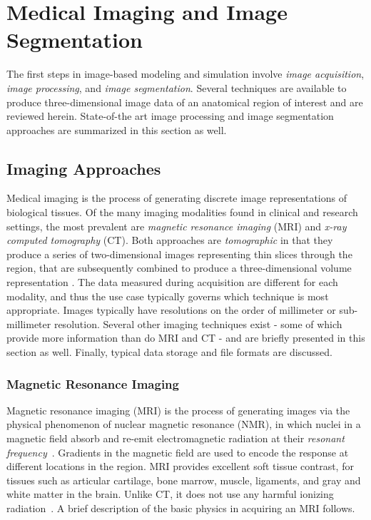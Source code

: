 \chapter{Medical Imaging and Image Segmentation}
%

The first steps in image-based modeling and simulation involve \textit{image acquisition}, \textit{image processing}, and \textit{image segmentation}. Several techniques are available to produce three-dimensional image data of an anatomical region of interest and are reviewed herein. State-of-the art image processing and image segmentation approaches are summarized in this section as well.

\section{Imaging Approaches}
\label{Imaging Approaches}

Medical imaging is the process of generating discrete image representations of biological tissues. Of the many imaging modalities found in clinical and research settings, the most prevalent are \textit{magnetic resonance imaging} (MRI) and \textit{x-ray computed tomography} (CT). Both approaches are \textit{tomographic} in that they produce a series of two-dimensional images representing thin slices through the region, that are subsequently combined to produce a three-dimensional volume representation \cite{larobina_murino_2014}. The data measured during acquisition are different for each modality, and thus the use case typically governs which technique is most appropriate. Images typically have resolutions on the order of millimeter or sub-millimeter resolution. Several other imaging techniques exist - some of which provide more information than do MRI and CT - and are briefly presented in this section as well. Finally, typical data storage and file formats are discussed.

\subsection{Magnetic Resonance Imaging}
\label{Magnetic Resonance Imaging}

Magnetic resonance imaging (MRI) is the process of generating images via the physical phenomenon of nuclear magnetic resonance (NMR), in which nuclei in a magnetic field absorb and re-emit electromagnetic radiation at their \textit{resonant frequency}~\cite{NMR}. Gradients in the magnetic field are used to encode the response at different locations in the region. MRI provides excellent soft tissue contrast, for tissues such as articular cartilage, bone marrow, muscle, ligaments, and gray and white matter in the brain. Unlike CT, it does not use any harmful ionizing radiation~\cite{waldman_campbell}. A brief description of the basic physics in acquiring an MRI follows.

